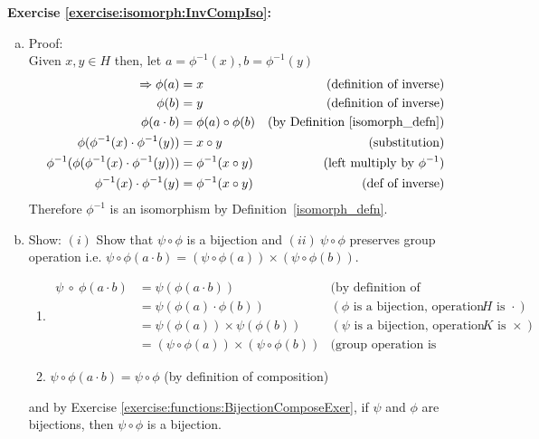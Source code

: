 \noindent\textbf{Exercise \ref{exercise:isomorph:InvCompIso}:}
\\
\begin{enumerate}[(a)]
\item
Proof: 
\\
Given $x, y \in H$ then, let $a = \phi^{-1}(x), b = \phi^{-1}(y)$
\begin{align*}
\implies \phi(a) &= x &\text{(definition of inverse)}
\\
\phi(b) &= y &\text{(definition of inverse)}
\\
\phi(a \cdot b) &= \phi(a) \circ \phi(b) &\text{(by Definition~\ref{isomorph_defn})}
\\
\phi(\phi^{-1}(x) \cdot \phi^{-1}(y)) &= x \circ y &\text{(substitution)}
\\
\phi^{-1}(\phi(\phi^{-1}(x) \cdot \phi^{-1}(y))) &= \phi^{-1}(x \circ y) &\text{(left multiply by\ } \phi^{-1})
\\
\phi^{-1}(x) \cdot \phi^{-1}(y) &= \phi^{-1}(x \circ y) &\text{(def of inverse)}
\end{align*}
Therefore $\phi^{-1}$ is an isomorphism by Definition~\ref{isomorph_defn}.
\\

\item
Show: $(i)$ Show that $\psi \circ \phi$ is a bijection and $(ii)\ \psi \circ \phi$ preserves group operation i.e. $\psi \circ \phi(a \cdot b) = (\psi \circ \phi(a)) \times (\psi \circ \phi(b))$.
	\begin{enumerate}[($i$)]
	\item
	\begin{align*}
	\psi \ \circ \ \phi(a \cdot b) &= \psi(\phi(a \cdot b)) &\text{(by definition of composition)}
	\\
	&=\psi(\phi(a) \cdot \phi(b)) &(\phi \text{\ is a bijection, operation of\ } H \text{\ is\ } \cdot)
	\\
	&= \psi(\phi(a)) \times \psi(\phi(b)) &(\psi \text{\ is a bijection, operation of\ } K \text{\ is\ } \times)
	\\
	&= (\psi \circ \phi(a)) \times (\psi \circ \phi(b)) &\text{(group operation is preserved)}
	\end{align*}

	\item
	$\psi \circ \phi(a \cdot b) = \psi \circ \phi$ \quad (by definition of composition)
	\end{enumerate}
and by Exercise \ref{exercise:functions:BijectionComposeExer}, if $\psi$ and $\phi$ are bijections, then $\psi \circ \phi$ is a bijection.
\end{enumerate}

